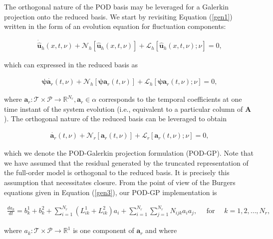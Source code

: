 \documentclass[preprint,12pt]{elsarticle}
\begin{document}
The orthogonal nature of the POD basis may be leveraged for a Galerkin projection onto the reduced basis. We start by revisiting Equation (\ref{gen1}) written in the form of an evolution equation for fluctuation components: 
\begin{linenomath*}
\begin{align}
\dot{\hat{\mathbf{u}}}_h(x,t,\nu) + \mathcal{N}_h[\hat{\mathbf{u}}_h(x,t,\nu)] + \mathcal{L}_h[\hat{\mathbf{u}}_h(x,t,\nu); \nu] = 0,
\end{align}
\end{linenomath*}
which can expressed in the reduced basis as 
\begin{linenomath*}
\begin{align}
\boldsymbol{\psi} \dot{\mathbf{a}_r}(t,\nu) + \mathcal{N}_h[\boldsymbol{\psi} \mathbf{a}_r(t,\nu)] + \mathcal{L}_h[\boldsymbol{\psi} \mathbf{a}_r(t,\nu); \nu] = 0,
\end{align}
\end{linenomath*}
where $\mathbf{a}_r : \mathcal{T} \times \mathcal{P} \rightarrow \mathbb{R}^{N_r}, \mathbf{a}_r  \in \alpha$ corresponds to the temporal coefficients at one time instant of the system evolution (i.e., equivalent to a particular column of $\mathbf{A}$). The orthogonal nature of the reduced basis can be leveraged to obtain
\begin{linenomath*}
\begin{align}
\dot{\mathbf{a}_r}(t,\nu) + \mathcal{N}_r[\mathbf{a}_r(t,\nu)] + \mathcal{L}_r[\mathbf{a}_r(t,\nu); \nu] = 0,
\end{align}
\end{linenomath*}
which we denote the POD-Galerkin projection formulation (POD-GP). Note that we have assumed that the residual generated by the truncated representation of the full-order model is orthogonal to the reduced basis.  It is precisely this assumption that necessitates closure. From the point of view of the Burgers equations given in Equation (\ref{gen3}), our POD-GP implementation is 
\begin{linenomath*}
\begin{align}
\frac{d a_{k}}{d t}=b_{k}^{1}+b_{k}^{2}+\sum_{i=1}^{N_r}\left(L_{i k}^{1}+L_{i k}^{2}\right) a_{i}+\sum_{i=1}^{N_r} \sum_{j=1}^{N_r} N_{i j k} a_{i} a_{j}, \quad \text { for } \quad k=1,2, \ldots, N_r,
\end{align}
\end{linenomath*}
where $a_k : \mathcal{T} \times \mathcal{P} \rightarrow \mathbb{R}^{1}$ is one component of $\mathbf{a}_r$ and where
\end{document}
